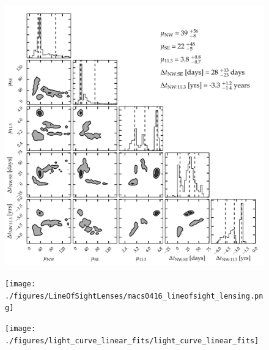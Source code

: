 










\begin{figure}[tbp]
  \begin{center}
    \includegraphics[width=\textwidth]{./figures/composite_lens_model_contours/composite_lens_model_contours}
    \caption{ \protect}
  \end{center}
\end{figure}

\begin{figure}[tbp]
  \begin{center}
    \texttt{[image: ./figures/LineOfSightLenses/macs0416\_lineofsight\_lensing.png]}
    \caption{\protect}
  \end{center}
\end{figure}

\begin{figure}[tbp]
  \begin{center}
    \texttt{[image: ./figures/light\_curve\_linear\_fits/light\_curve\_linear\_fits]}
    \caption{\protect}
  \end{center}
\end{figure}

